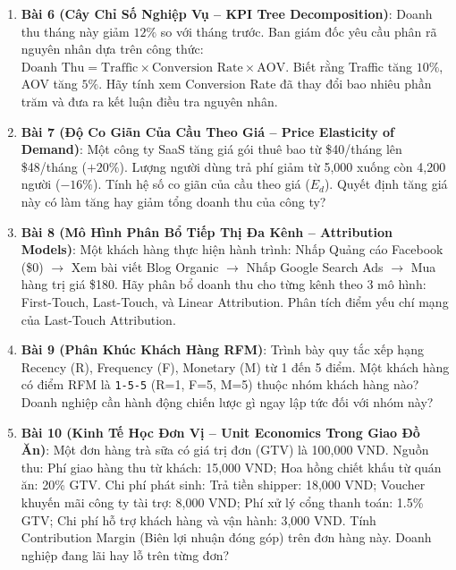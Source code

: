 \begin{baitapbox}
\begin{enumerate}
\begin{itemize}
        \item Google: Campaign A có $CR = 8.0\%$ (320/4,000 clicks); Campaign B có $CR = 8.5\%$ (85/1,000 clicks).
    \end{itemize}
    Tính tổng Conversion Rate của từng chiến dịch gộp cả hai nền tảng. Giải thích tại sao Campaign B thắng ở cả hai nền tảng riêng lẻ nhưng khi gộp lại Campaign A lại có tỷ lệ chuyển đổi cao hơn gấp bội.
    \item \textbf{Bài 6 (Cây Chỉ Số Nghiệp Vụ -- KPI Tree Decomposition)}: Doanh thu tháng này giảm $12\%$ so với tháng trước. Ban giám đốc yêu cầu phân rã nguyên nhân dựa trên công thức: $\text{Doanh Thu} = \text{Traffic} \times \text{Conversion Rate} \times \text{AOV}$. Biết rằng Traffic tăng $10\%$, AOV tăng $5\%$. Hãy tính xem Conversion Rate đã thay đổi bao nhiêu phần trăm và đưa ra kết luận điều tra nguyên nhân.
    \item \textbf{Bài 7 (Độ Co Giãn Của Cầu Theo Giá -- Price Elasticity of Demand)}: Một công ty SaaS tăng giá gói thuê bao từ \$40/tháng lên \$48/tháng ($+20\%$). Lượng người dùng trả phí giảm từ 5,000 xuống còn 4,200 người ($-16\%$). Tính hệ số co giãn của cầu theo giá ($E_d$). Quyết định tăng giá này có làm tăng hay giảm tổng doanh thu của công ty?
    \item \textbf{Bài 8 (Mô Hình Phân Bổ Tiếp Thị Đa Kênh -- Attribution Models)}: Một khách hàng thực hiện hành trình: Nhấp Quảng cáo Facebook (\$0) $\rightarrow$ Xem bài viết Blog Organic $\rightarrow$ Nhấp Google Search Ads $\rightarrow$ Mua hàng trị giá \$180. Hãy phân bổ doanh thu cho từng kênh theo 3 mô hình: First-Touch, Last-Touch, và Linear Attribution. Phân tích điểm yếu chí mạng của Last-Touch Attribution.
    \item \textbf{Bài 9 (Phân Khúc Khách Hàng RFM)}: Trình bày quy tắc xếp hạng Recency (R), Frequency (F), Monetary (M) từ 1 đến 5 điểm. Một khách hàng có điểm RFM là \texttt{1-5-5} (R=1, F=5, M=5) thuộc nhóm khách hàng nào? Doanh nghiệp cần hành động chiến lược gì ngay lập tức đối với nhóm này?
    \item \textbf{Bài 10 (Kinh Tế Học Đơn Vị -- Unit Economics Trong Giao Đồ Ăn)}: Một đơn hàng trà sữa có giá trị đơn (GTV) là 100,000 VND. Nguồn thu: Phí giao hàng thu từ khách: 15,000 VND; Hoa hồng chiết khấu từ quán ăn: 20\% GTV. Chi phí phát sinh: Trả tiền shipper: 18,000 VND; Voucher khuyến mãi công ty tài trợ: 8,000 VND; Phí xử lý cổng thanh toán: 1.5\% GTV; Chi phí hỗ trợ khách hàng và vận hành: 3,000 VND. Tính Contribution Margin (Biên lợi nhuận đóng góp) trên đơn hàng này. Doanh nghiệp đang lãi hay lỗ trên từng đơn?

\end{enumerate}
\end{baitapbox}
